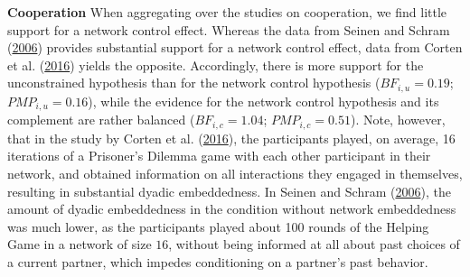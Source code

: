 \documentclass[
  11pt,
]{article}
\begin{document}
\textbf{Cooperation} \hspace{8pt}When aggregating over the studies on cooperation, we find little support for a network control effect.
Whereas the data from Seinen and Schram (\protect\hyperlink{ref-seinen_schram_social_2006}{2006}) provides substantial support for a network control effect, data from Corten et al. (\protect\hyperlink{ref-corten_etal_reputation_2016}{2016}) yields the opposite.
Accordingly, there is more support for the unconstrained hypothesis than for the network control hypothesis (\(BF_{i,u} = 0.19\); \(PMP_{i,u} = 0.16\)), while the evidence for the network control hypothesis and its complement are rather balanced (\(BF_{i,c} = 1.04\); \(PMP_{i,c} = 0.51\)).
Note, however, that in the study by Corten et al. (\protect\hyperlink{ref-corten_etal_reputation_2016}{2016}), the participants played, on average, 16 iterations of a Prisoner's Dilemma game with each other participant in their network, and obtained information on all interactions they engaged in themselves, resulting in substantial dyadic embeddedness.
In Seinen and Schram (\protect\hyperlink{ref-seinen_schram_social_2006}{2006}), the amount of dyadic embeddedness in the condition without network embeddedness was much lower, as the participants played about 100 rounds of the Helping Game in a network of size \(16\), without being informed at all about past choices of a current partner, which impedes conditioning on a partner's past behavior.
\end{document}
